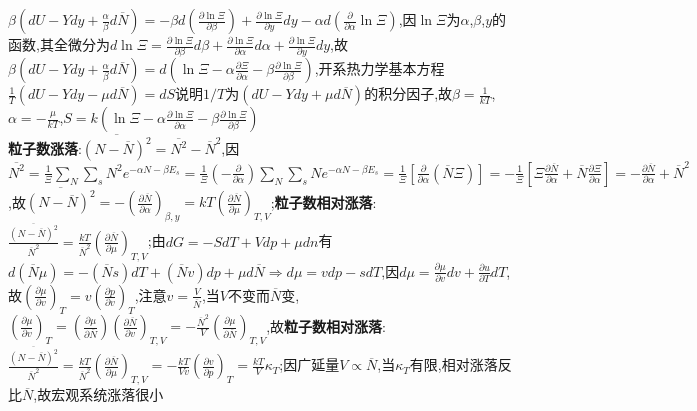 \documentclass[10pt,a4paper]{article}
\begin{document}
\begin{multicols}{2}
$\beta(dU-Ydy+\frac{\alpha}{\beta}d\overline{N})=-\beta d\left(\frac{\partial\ln\Xi}{\partial\beta}\right)+\frac{\partial\ln\Xi}{\partial y}dy-\alpha d\left(\frac{\partial}{\partial\alpha}\ln\Xi\right)$,因$\ln\Xi$为$\alpha$,$\beta$,$y$的函数,其全微分为$d\ln\Xi=\frac{\partial\ln\Xi}{\partial\beta}d\beta+\frac{\partial\ln\Xi}{\partial\alpha}d\alpha+\frac{\partial\ln\Xi}{\partial y}dy$,故$\beta\left(dU-Ydy+\frac{\alpha}{\beta}d\overline{N}\right)=d\left(\ln\Xi-\alpha\frac{\partial\Xi}{\partial\alpha}-\beta\frac{\partial\ln\Xi}{\partial\beta}\right)$,开系热力学基本方程$\frac{1}{T}(dU-Ydy-\mu d\overline{N})=dS$说明$1/T$为$\left(dU-Ydy+\mu d\overline{N}\right)$的积分因子,故$\beta=\frac{1}{kT}$,$\alpha=-\frac{\mu}{kT}$,$S=k\left(\ln\Xi-\alpha\frac{\partial\ln\Xi}{\partial\alpha}-\beta\frac{\partial\ln\Xi}{\partial\beta}\right)$\\
\textbf{粒子数涨落}:$\overline{(N-\overline{N})^2}=\overline{N^2}-\overline{N}^2$,因$\overline{N^2}=\frac{1}{\Xi}\sum_N\sum_sN^2e^{-\alpha N-\beta E_s}=\frac{1}{\Xi}\left(-\frac{\partial}{\partial\alpha}\right)\sum_N\sum_sNe^{-\alpha N-\beta E_s}=\frac{1}{\Xi}\left[\frac{\partial}{\partial\alpha}(\overline{N}\Xi)\right]=-\frac{1}{\Xi}\left[\Xi\frac{\partial\overline{N}}{\partial\alpha}+\overline{N}\frac{\partial\Xi}{\partial\alpha}\right]=-\frac{\partial\overline{N}}{\partial\alpha}+\overline{N}^2$,故$\overline{(N-\overline{N})^2}=-\left(\frac{\partial\overline{N}}{\partial\alpha}\right)_{\beta,y}=kT\left(\frac{\partial\overline{N}}{\partial\mu}\right)_{T,V}$;\textbf{粒子数相对涨落}:$\frac{\overline{(N-\overline{N})^2}}{\overline{N}^2}=\frac{kT}{\overline{N}^2}\left(\frac{\partial\overline{N}}{\partial\mu}\right)_{T,V}$;由$dG=-SdT+Vdp+\mu dn$有$d(\overline{N}\mu)=-(\overline{N}s)dT+(\overline{N}v)dp+\mu d\overline{N}\Rightarrow d\mu=vdp-sdT$,因$d\mu=\frac{\partial\mu}{\partial v}dv+\frac{\partial u}{\partial T}dT$,故$\left(\frac{\partial\mu}{\partial v}\right)_T=v\left(\frac{\partial p}{\partial v}\right)_T$,注意$v=\frac{V}{\overline{N}}$,当$V$不变而$\overline{N}$变,$\left(\frac{\partial\mu}{\partial v}\right)_T=\left(\frac{\partial\mu}{\partial\overline{N}}\right)\left(\frac{\partial\overline{N}}{\partial v}\right)_{T,V}=-\frac{\overline{N}^2}{V}\left(\frac{\partial\mu}{\partial\overline{N}}\right)_{T,V}$,故\textbf{粒子数相对涨落}:$\frac{\overline{(N-\overline{N})^2}}{\overline{N}^2}=\frac{kT}{\overline{N}^2}\left(\frac{\partial\overline{N}}{\partial\mu}\right)_{T,V}=-\frac{kT}{Vv}\left(\frac{\partial v}{\partial p}\right)_T=\frac{kT}{V}\kappa_T$;因广延量$V\propto\overline{N}$,当$\kappa_T$有限,相对涨落反比$\overline{N}$,故宏观系统涨落很小\\

\end{multicols}
\end{document}
